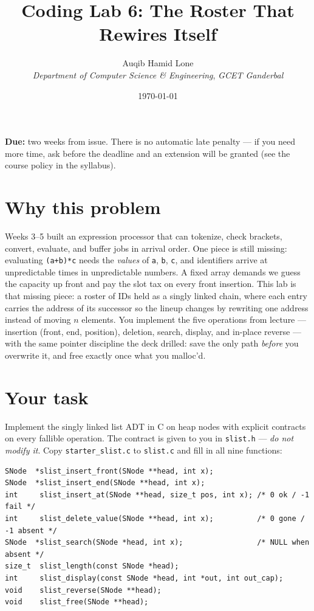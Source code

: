 \documentclass[11pt]{article}
\title{Coding Lab 6: The Roster That Rewires Itself}
\author{Auqib Hamid Lone\\[0.3em]
  \emph{Department of Computer Science \& Engineering}, \emph{GCET Ganderbal}}
\date{\today}
\begin{document}
\maketitle

\noindent\textbf{Due:} two weeks from issue. There is no automatic late penalty --- if you need more time, ask before the deadline and an extension will be granted (see the course policy in the syllabus).

\section{Why this problem}

Weeks 3--5 built an expression processor that can tokenize, check brackets, convert, evaluate, and buffer jobs in arrival order. One piece is still missing: evaluating \texttt{(a+b)*c} needs the \emph{values} of \texttt{a}, \texttt{b}, \texttt{c}, and identifiers arrive at unpredictable times in unpredictable numbers. A fixed array demands we guess the capacity up front and pay the slot tax on every front insertion. This lab is that missing piece: a roster of IDs held as a singly linked chain, where each entry carries the address of its successor so the lineup changes by rewriting one address instead of moving $n$ elements. You implement the five operations from lecture --- insertion (front, end, position), deletion, search, display, and in-place reverse --- with the same pointer discipline the deck drilled: save the only path \emph{before} you overwrite it, and free exactly once what you malloc'd.

\section{Your task}

Implement the singly linked list ADT in C on heap nodes with explicit contracts on every fallible operation. The contract is given to you in \texttt{slist.h} --- \emph{do not modify it}. Copy \texttt{starter\_slist.c} to \texttt{slist.c} and fill in all nine functions:

\begin{verbatim}
SNode  *slist_insert_front(SNode **head, int x);
SNode  *slist_insert_end(SNode **head, int x);
int     slist_insert_at(SNode **head, size_t pos, int x); /* 0 ok / -1 fail */
int     slist_delete_value(SNode **head, int x);          /* 0 gone / -1 absent */
SNode  *slist_search(SNode *head, int x);                 /* NULL when absent */
size_t  slist_length(const SNode *head);
int     slist_display(const SNode *head, int *out, int out_cap);
void    slist_reverse(SNode **head);
void    slist_free(SNode **head);
\end{verbatim}
\end{document}
